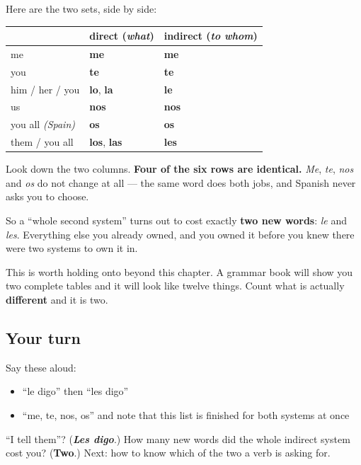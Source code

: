 \begin{grammarlens}[title={What you've built}]
Here are the two sets, side by side:

\noindent
\begin{tabularx}{\linewidth}{@{}>{\raggedright\arraybackslash}X>{\raggedright\arraybackslash}X>{\raggedright\arraybackslash}X@{}}
\toprule
\textbf{} & \textbf{direct (\emph{what})} & \textbf{indirect (\emph{to whom})} \\
\midrule
me & \textbf{me} & \textbf{me} \\
you & \textbf{te} & \textbf{te} \\
him / her / you & \textbf{lo}, \textbf{la} & \textbf{le} \\
us & \textbf{nos} & \textbf{nos} \\
you all \emph{(Spain)} & \textbf{os} & \textbf{os} \\
them / you all & \textbf{los}, \textbf{las} & \textbf{les} \\
\bottomrule
\end{tabularx}

Look down the two columns. \textbf{Four of the six rows are identical.} \emph{Me}, \emph{te}, \emph{nos} and \emph{os} do not change at all — the same word does both jobs, and Spanish never asks you to choose.

So a \textquotedblleft{}whole second system\textquotedblright{} turns out to cost exactly \textbf{two new words}: \emph{le} and \emph{les}. Everything else you already owned, and you owned it before you knew there were two systems to own it in.

This is worth holding onto beyond this chapter. A grammar book will show you two complete tables and it will look like twelve things. Count what is actually \textbf{different} and it is two.
\end{grammarlens}

\subsection*{Your turn}
Say these aloud:

\begin{itemize}
\raggedright
  \item \textquotedblleft{}le digo\textquotedblright{} then \textquotedblleft{}les digo\textquotedblright{}
  \item \textquotedblleft{}me, te, nos, os\textquotedblright{} and note that this list is finished for both systems at once
\end{itemize}

\begin{tcolorbox}[breakable,colback=teal!4,colframe=teal!35!black,title={Before you move on}]
\textquotedblleft{}I tell them\textquotedblright{}? (\emph{\textbf{Les digo}}.) How many new words did the whole indirect system cost you? (\textbf{Two}.) Next: how to know which of the two a verb is asking for.
\end{tcolorbox}
